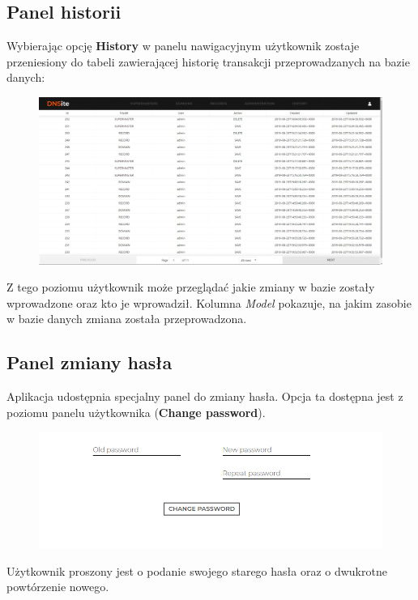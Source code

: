 \documentclass[12pt] {article}
\begin{document}
\subsection{Panel historii}
Wybierając opcję \textbf{History} w panelu nawigacyjnym użytkownik zostaje przeniesiony do tabeli zawierającej historię transakcji przeprowadzanych na bazie danych:
\begin{figure}[H]
\centering
\includegraphics[width=\textwidth]{res/18_historia}
\end{figure}
Z tego poziomu użytkownik może przeglądać jakie zmiany w bazie zostały wprowadzone oraz kto je wprowadził. Kolumna \emph{Model} pokazuje, na jakim zasobie w bazie danych zmiana została przeprowadzona. 


\subsection{Panel zmiany hasła}
Aplikacja udostępnia specjalny panel do zmiany hasła. Opcja ta dostępna jest z poziomu panelu użytkownika (\textbf{Change password}).
\begin{figure}[H]
\centering
\includegraphics[width=\textwidth]{res/19_zmiana_hasla}
\end{figure}
Użytkownik proszony jest o podanie swojego starego hasła oraz o dwukrotne powtórzenie nowego.
\end{document}

